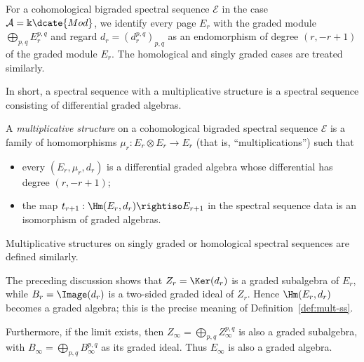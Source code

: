 \begin{convention}
	For a cohomological bigraded spectral sequence $\mathscr{E}$ in the case
	$\mathcal{A}=\Bbbk\dcate{Mod}$, we identify every page $E_r$ with the
	graded module $\bigoplus_{p,q}E_r^{p,q}$ and regard
	$d_r=(d_r^{p,q})_{p,q}$ as an endomorphism of degree $(r,-r+1)$ of the
	graded module $E_r$. The homological and singly graded cases are treated
	similarly.
\end{convention}

In short, a spectral sequence with a multiplicative structure is a spectral
sequence consisting of differential graded algebras.

\begin{definition}\label{def:mult-ss}
	A \emph{multiplicative structure} on a cohomological bigraded spectral
	sequence $\mathscr{E}$ is a family of homomorphisms
	$\mu_r:E_r\otimes E_r\to E_r$ (that is, ``multiplications'') such that
	\begin{itemize}
		\item every $(E_r,\mu_r,d_r)$ is a differential graded algebra whose
		differential has degree $(r,-r+1)$;
		\item the map $t_{r+1}:\Hm(E_r,d_r)\rightiso E_{r+1}$ in the spectral
		sequence data is an isomorphism of graded algebras.
	\end{itemize}
	Multiplicative structures on singly graded or homological spectral sequences
	are defined similarly.
\end{definition}

The preceding discussion shows that $Z_r=\Ker(d_r)$ is a graded subalgebra of
$E_r$, while $B_r=\Image(d_r)$ is a two-sided graded ideal of $Z_r$. Hence
$\Hm(E_r,d_r)$ becomes a graded algebra; this is the precise meaning of
Definition~\ref{def:mult-ss}.

Furthermore, if the limit exists, then
$Z_\infty=\bigoplus_{p,q}Z_\infty^{p,q}$ is also a graded subalgebra, with
$B_\infty=\bigoplus_{p,q}B_\infty^{p,q}$ as its graded ideal. Thus
$E_\infty$ is also a graded algebra.

